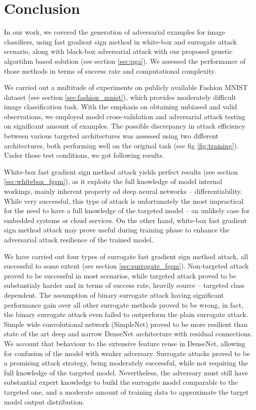 \chapter*{Conclusion}

In our work, we covered the generation of adversarial examples for image classifiers, using fast gradient sign method in white-box and surrogate attack scenario, along with black-box adversarial attack with our proposed genetic algortihm based solution (see section \ref{sec:pga}). We assessed the performance of those methods in terms of success rate and computational complexity.

We carried out a multitude of experiments on publicly available Fashion MNIST dataset (see section \ref{sec:fashion_mnist}), which provides moderately difficult image classification task. With the emphasis on obtaining unbiased and valid observations, we employed model cross-validation and adversarial attack testing on significant amount of examples. The possible discrepancy in attack efficiency between various targeted architectures was assessed using two different architectures, both performing well on the original task (see fig \ref{fig:training}). Under those test conditions, we got following results.

White-box fast gradient sign method attack yields perfect results (see section \ref{sec:whitebox_fgsm}), as it exploits the full knowledge of model internal workings, mainly inherent property od deep neural networks -- differentiability. While very successful, this type of attack is unfortunately the most impractical for the need to have a full knowledge of the targeted model -- an unlikely case for embedded systems or cloud services. On the other hand, white-box fast gradient sign method attack may prove useful during training phase to enhance the adversarial attack resilience of the trained model.

We have carried out four types of surrogate fast gradient sign method attack, all successful to some extent (see section \ref{sec:surrogate_fgsm}). Non-targeted attack proved to be successful in most scenarios, while targeted attack proved to be substantialy harder and in terms of success rate, heavily source -- targeted class dependent. The assumption of binary surrogate attack having significant performance gain over all other surrogate methods proved to be wrong, in fact, the binary surrogate attack even failed to outperform the plain surrogate attack. Simple wide convolutional network (SimpleNet) proved to be more resilient than state of the art deep and narrow DenseNet architecture with residual connections. We account that behaviour to the extensive feature reuse in DenseNet, allowing for confusion of the model with weaker adversary. Surrogate attacks proved to be a promising attack strategy, being moderately successful, while not requiring the full knowledge of the targeted model. Nevertheless, the adversary must still have substantial expert knowledge to build the surrogate model comparable to the targeted one, and a moderate amount of training data to approximate the target model output distribution.

